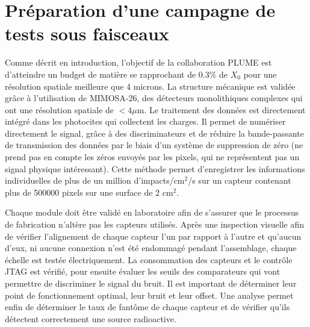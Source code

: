 \documentclass[a4papper, 10pt]{article}
\begin{document}
  \section{Préparation d'une campagne de tests sous faisceaux}

  Comme décrit en introduction, l'objectif de la collaboration PLUME est d'atteindre un budget de matière se rapprochant de 0.3\% de $X_0$ pour une résolution spatiale meilleure que 4 microns.
  La structure mécanique est validée grâce à l'utilisation de MIMOSA-26, des détecteurs monolithiques complexes qui ont une résolution spatiale de $< 4 \mu$m.
  Le traitement des données est directement intégré dans les photocites qui collectent les charges. 
  Il permet de numériser directement le signal, grâce à des discriminateurs et de réduire la bande-passante de transmission des données par le biais d'un système de suppression de zéro (ne prend pas en compte les zéros envoyés par les pixels, qui ne représentent pas un signal physique intéressant).
  Cette méthode permet d'enregistrer les informations individuelles de plus de un million d'impacts/cm$^2$/s sur un capteur contenant plus de 500000 pixels sur une surface de 2 cm$^2$.

  Chaque module doit être validé en laboratoire afin de s'assurer que le processus de fabrication n'altère pas les capteurs utilisés.
  Après une inspection visuelle afin de vérifier l'alignement de chaque capteur l'un par rapport à l'autre et qu'aucun d'eux, ni aucune connexion n'est été endommagé pendant l'assemblage, chaque échelle est testée électriquement.
  La consommation des capteurs et le contrôle JTAG est vérifié, pour ensuite évaluer les seuils des comparateurs qui vont permettre de discriminer le signal du bruit.
  Il est important de déterminer leur point de fonctionnement optimal, leur bruit et leur offset. 
  Une analyse permet enfin de déterminer le taux de fantôme de chaque capteur et de vérifier qu'ils détectent correctement une source radioactive.
  
\end{document}
